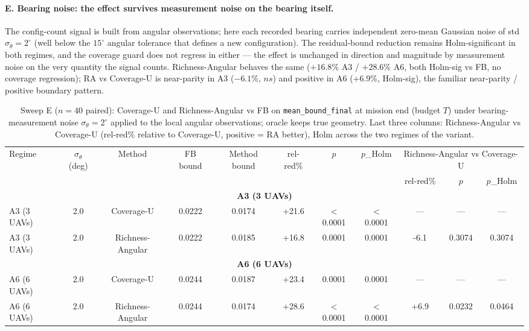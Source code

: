 \documentclass[journal]{IEEEtran}
\newcommand{\CU}{Coverage-U}
\newcommand{\RA}{Richness-Angular}
\begin{document}
\paragraph{E. Bearing noise: the effect survives measurement noise on the
bearing itself.}
The config-count signal is built from angular observations; here each recorded
bearing carries independent zero-mean Gaussian noise of std
$\sigma_\theta = 2^\circ$ (well below the $15^\circ$ angular tolerance that
defines a new configuration). The residual-bound reduction remains
Holm-significant in both regimes, and the coverage guard does not regress in
either --- the effect is unchanged in direction and magnitude by measurement
noise on the very quantity the signal counts. \RA{} behaves the same
($+16.8\%$ A3 / $+28.6\%$ A6, both Holm-sig vs FB, no coverage regression); RA
vs \CU{} is near-parity in A3 ($-6.1\%$, $ns$) and positive in A6 (+6.9\%,
Holm-sig), the familiar near-parity / positive boundary pattern.

\begin{table}[t]
\caption{Sweep E ($n = 40$ paired): \CU{} and \RA{} vs FB on \texttt{mean\_bound\_final} at mission end (budget $T$) under bearing-measurement noise $\sigma_\theta = 2^\circ$ applied to the local angular observations; oracle keeps true geometry. Last three columns: \RA{} vs \CU{} (rel-red\% relative to \CU{}, positive = RA better), Holm across the two regimes of the variant.}
\label{tab:sweepE}
\centering
\begin{tabular}{l c c c c c c c c c c}
\toprule
Regime & $\sigma_\theta$ (deg) & Method & FB bound & Method bound & rel-red\% & $p$ & $p$\_Holm & \multicolumn{3}{c}{\RA{} vs \CU{}} \\
\cmidrule(lr){9-11}
& & & & & & & & rel-red\% & $p$ & $p$\_Holm \\
\midrule
\multicolumn{11}{c}{\textbf{A3 (3 UAVs)}} \\
\midrule
A3 (3 UAVs) & 2.0 & \CU & 0.0222 & 0.0174 & +21.6 & $<$0.0001 & $<$0.0001 & --- & --- & --- \\
A3 (3 UAVs) & 2.0 & \RA & 0.0222 & 0.0185 & +16.8 & 0.0001 & 0.0001 & -6.1 & 0.3074 & 0.3074 \\
\multicolumn{11}{c}{\textbf{A6 (6 UAVs)}} \\
\midrule
A6 (6 UAVs) & 2.0 & \CU & 0.0244 & 0.0187 & +23.4 & 0.0001 & 0.0001 & --- & --- & --- \\
A6 (6 UAVs) & 2.0 & \RA & 0.0244 & 0.0174 & +28.6 & $<$0.0001 & $<$0.0001 & +6.9 & 0.0232 & 0.0464 \\
\bottomrule
\end{tabular}
\end{table}
\end{document}
